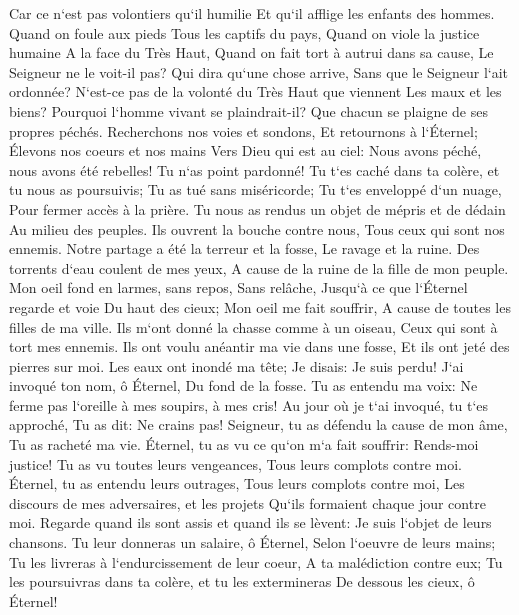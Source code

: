 \verse Car ce n`est pas volontiers qu`il humilie Et qu`il afflige les enfants des hommes. 
\verse Quand on foule aux pieds Tous les captifs du pays, 
\verse Quand on viole la justice humaine A la face du Très Haut, 
\verse Quand on fait tort à autrui dans sa cause, Le Seigneur ne le voit-il pas? 
\verse Qui dira qu`une chose arrive, Sans que le Seigneur l`ait ordonnée? 
\verse N`est-ce pas de la volonté du Très Haut que viennent Les maux et les biens? 
\verse Pourquoi l`homme vivant se plaindrait-il? Que chacun se plaigne de ses propres péchés. 
\verse Recherchons nos voies et sondons, Et retournons à l`Éternel; 
\verse Élevons nos coeurs et nos mains Vers Dieu qui est au ciel: 
\verse Nous avons péché, nous avons été rebelles! Tu n`as point pardonné! 
\verse Tu t`es caché dans ta colère, et tu nous as poursuivis; Tu as tué sans miséricorde; 
\verse Tu t`es enveloppé d`un nuage, Pour fermer accès à la prière. 
\verse Tu nous as rendus un objet de mépris et de dédain Au milieu des peuples. 
\verse Ils ouvrent la bouche contre nous, Tous ceux qui sont nos ennemis. 
\verse Notre partage a été la terreur et la fosse, Le ravage et la ruine. 
\verse Des torrents d`eau coulent de mes yeux, A cause de la ruine de la fille de mon peuple. 
\verse Mon oeil fond en larmes, sans repos, Sans relâche, 
\verse Jusqu`à ce que l`Éternel regarde et voie Du haut des cieux; 
\verse Mon oeil me fait souffrir, A cause de toutes les filles de ma ville. 
\verse Ils m`ont donné la chasse comme à un oiseau, Ceux qui sont à tort mes ennemis. 
\verse Ils ont voulu anéantir ma vie dans une fosse, Et ils ont jeté des pierres sur moi. 
\verse Les eaux ont inondé ma tête; Je disais: Je suis perdu! 
\verse J`ai invoqué ton nom, ô Éternel, Du fond de la fosse. 
\verse Tu as entendu ma voix: Ne ferme pas l`oreille à mes soupirs, à mes cris! 
\verse Au jour où je t`ai invoqué, tu t`es approché, Tu as dit: Ne crains pas! 
\verse Seigneur, tu as défendu la cause de mon âme, Tu as racheté ma vie. 
\verse Éternel, tu as vu ce qu`on m`a fait souffrir: Rends-moi justice! 
\verse Tu as vu toutes leurs vengeances, Tous leurs complots contre moi. 
\verse Éternel, tu as entendu leurs outrages, Tous leurs complots contre moi, 
\verse Les discours de mes adversaires, et les projets Qu`ils formaient chaque jour contre moi. 
\verse Regarde quand ils sont assis et quand ils se lèvent: Je suis l`objet de leurs chansons. 
\verse Tu leur donneras un salaire, ô Éternel, Selon l`oeuvre de leurs mains; 
\verse Tu les livreras à l`endurcissement de leur coeur, A ta malédiction contre eux; 
\verse Tu les poursuivras dans ta colère, et tu les extermineras De dessous les cieux, ô Éternel! 

